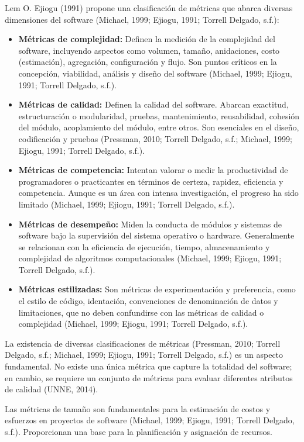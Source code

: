 \documentclass[11pt]{article}
\begin{document}
Lem O. Ejiogu (1991) propone una clasificación de métricas que abarca diversas dimensiones del software (Michael, 1999; Ejiogu, 1991; Torrell Delgado, s.f.):

\begin{itemize}
    \item \textbf{Métricas de complejidad:} Definen la medición de la complejidad del software, incluyendo aspectos como volumen, tamaño, anidaciones, costo (estimación), agregación, configuración y flujo. Son puntos críticos en la concepción, viabilidad, análisis y diseño del software (Michael, 1999; Ejiogu, 1991; Torrell Delgado, s.f.).
    \item \textbf{Métricas de calidad:} Definen la calidad del software. Abarcan exactitud, estructuración o modularidad, pruebas, mantenimiento, reusabilidad, cohesión del módulo, acoplamiento del módulo, entre otros. Son esenciales en el diseño, codificación y pruebas (Pressman, 2010; Torrell Delgado, s.f.; Michael, 1999; Ejiogu, 1991; Torrell Delgado, s.f.).
    \item \textbf{Métricas de competencia:} Intentan valorar o medir la productividad de programadores o practicantes en términos de certeza, rapidez, eficiencia y competencia. Aunque es un área con intensa investigación, el progreso ha sido limitado (Michael, 1999; Ejiogu, 1991; Torrell Delgado, s.f.).
    \item \textbf{Métricas de desempeño:} Miden la conducta de módulos y sistemas de software bajo la supervisión del sistema operativo o hardware. Generalmente se relacionan con la eficiencia de ejecución, tiempo, almacenamiento y complejidad de algoritmos computacionales (Michael, 1999; Ejiogu, 1991; Torrell Delgado, s.f.).
    \item \textbf{Métricas estilizadas:} Son métricas de experimentación y preferencia, como el estilo de código, identación, convenciones de denominación de datos y limitaciones, que no deben confundirse con las métricas de calidad o complejidad (Michael, 1999; Ejiogu, 1991; Torrell Delgado, s.f.).
\end{itemize}

La existencia de diversas clasificaciones de métricas (Pressman, 2010; Torrell Delgado, s.f.; Michael, 1999; Ejiogu, 1991; Torrell Delgado, s.f.) es un aspecto fundamental. No existe una única métrica que capture la totalidad del software; en cambio, se requiere un conjunto de métricas para evaluar diferentes atributos de calidad (UNNE, 2014).

Las métricas de tamaño son fundamentales para la estimación de costos y esfuerzos en proyectos de software (Michael, 1999; Ejiogu, 1991; Torrell Delgado, s.f.). Proporcionan una base para la planificación y asignación de recursos.
\end{document}
